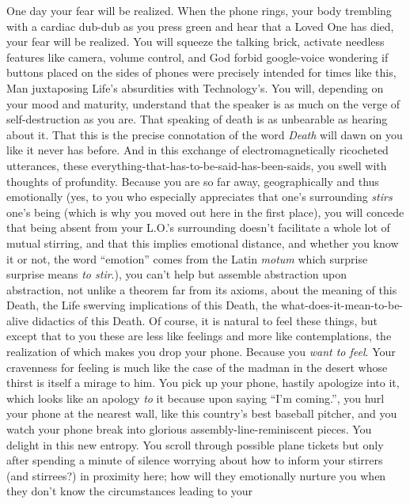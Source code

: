 \documentclass{article}
\begin{document}
\newline

One day your fear will be realized. When the phone rings, your body
trembling with a cardiac dub-dub as you press green and hear that
a Loved One has died, your fear will be realized. You will squeeze the
talking brick, activate needless features like camera, volume control,
and God forbid google-voice wondering if buttons placed on the sides of
phones were precisely intended for times like this, Man juxtaposing
Life's absurdities with Technology's. You will, depending on your mood
and maturity, understand that the speaker is as much on the verge of
self-destruction as you are. That speaking of death is as unbearable as
hearing about it. That this is the precise connotation of the word
\textit{Death} will dawn on you like it never has before. And in this
exchange of electromagnetically ricocheted utterances, these
everything-that-has-to-be-said-has-been-saids, you swell with thoughts
of profundity. Because you are so far away, geographically and thus
emotionally (yes, to you who especially appreciates that one's
surrounding \textit{stirs} one's being (which is why you moved out here
in the first place), you will concede that being absent from your L.O.'s
surrounding doesn't facilitate a whole lot of mutual stirring, and that
this implies emotional distance, and whether you know it or not, the
word ``emotion'' comes from the Latin \textit{motum} which surprise
surprise means \textit{to stir}.), you can't help but assemble
abstraction upon abstraction, not unlike a theorem far from its axioms,
about the meaning of this Death, the Life swerving implications of this
Death, the what-does-it-mean-to-be-alive didactics of this Death. Of
course, it is natural to feel these things, but except that to you these
are less like feelings and more like contemplations, the realization of
which makes you drop your phone. Because you \textit{want to feel}. Your
cravenness for feeling is much like the case of the madman in the desert
whose thirst is itself a mirage to him. You pick up your phone, hastily
apologize into it, which looks like an apology \textit{to} it because
upon saying ``I'm coming.'', you hurl your phone at the nearest wall,
like this country's best baseball pitcher, and you watch your phone
break into glorious assembly-line-reminiscent pieces. You delight in
this new entropy. You scroll through possible plane tickets but only
after spending a minute of silence worrying about how to inform your
stirrers (and stirrees?) in proximity here; how will they emotionally
nurture you when they don't know the circumstances leading to your
\end{document}
